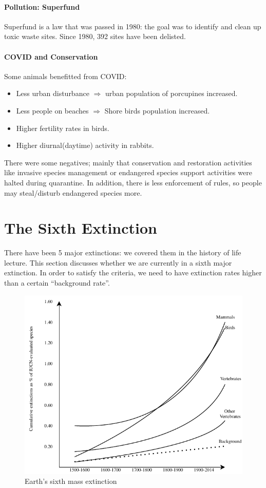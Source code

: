 \documentclass[12pt]{article}
\begin{document}
\paragraph{Pollution: Superfund}
Superfund is a law that was passed in 1980: the goal was to identify and clean up toxic waste sites. Since 1980, 392 sites have been delisted. 

\paragraph{COVID and Conservation}
Some animals benefitted from COVID:
\begin{itemize}
    \item Less urban disturbance $\Rightarrow$ urban population of porcupines increased.
    \item Less people on beaches $\Rightarrow$ Shore birds population increased.
    \item Higher fertility rates in birds.
    \item Higher diurnal(daytime) activity in rabbits.
\end{itemize} 

There were some negatives; mainly that conservation and restoration activities like invasive species management or endangered species support activities were halted during quarantine. In addition, there is less enforcement of rules, so people may steal/disturb endangered species more. 

\section{The Sixth Extinction}

There have been 5 major extinctions: we covered them in the history of life lecture. This section discusses whether we are currently in a sixth major extinction. In order to satisfy the criteria, we need to have extinction rates higher than a certain ``background rate''. 

\begin{figure}[tph]
    \centering
    \includegraphics[width=5in]{extinction.pdf}
    \caption{Earth's sixth mass extinction} \label{extinction}
\end{figure}
\end{document}

